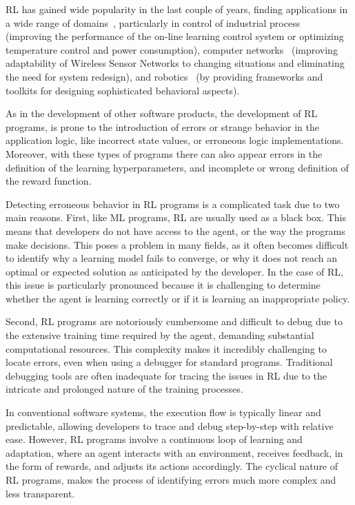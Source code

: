 \ac{RL} has gained wide popularity in the last couple of years, finding applications in a wide range of 
domains~\citet{beakcheol19}, particularly in control of industrial process~\cite{kiumarsi18} (improving 
the performance of the on-line learning control system or optimizing temperature control and power 
consumption), computer networks~\cite{alrawi13} (improving adaptability of Wireless Sensor Networks 
to changing situations and eliminating the need for system redesign), and robotics~\cite{zhang15} (by 
providing frameworks and toolkits for designing sophisticated behavioral aspects). 

As in the development of other software products, the development of \ac{RL} programs, is prone to 
the introduction of errors or strange behavior in the application logic, like incorrect state values, or 
erroneous logic implementations. Moreover, with these types of programs there can also appear 
errors in the definition of the learning hyperparameters, and incomplete or wrong definition of the 
reward function. 

Detecting erroneous behavior in \ac{RL} programs is a complicated task due to two main 
reasons. First, like \ac{ML} programs, \ac{RL} are usually used as a black box. 
This means that developers do not have access to the agent, or the way the programs make 
decisions. This poses a problem in many fields, as it often becomes difficult to identify why a learning 
model fails to converge, or why it does not reach an optimal or expected solution as 
anticipated by the developer. In the case of \ac{RL}, this issue is particularly 
pronounced because it is challenging to determine whether the agent is learning 
correctly or if it is learning an inappropriate policy.

Second, \ac{RL} programs are notoriously cumbersome and difficult to debug due to the extensive 
training time required by the agent, demanding substantial computational resources. This 
complexity makes it incredibly challenging to locate errors, even when using a 
debugger for standard programs. Traditional debugging tools are often inadequate 
for tracing the issues in \ac{RL} due to the intricate and prolonged nature of the 
training processes. 

In conventional software systems, the execution flow is typically linear and predictable, 
allowing developers to trace and debug step-by-step with relative ease. However, 
\ac{RL} programs involve a continuous loop of learning and adaptation, where an agent 
interacts with an environment, receives feedback, in the form of rewards, and adjusts its actions 
accordingly. The cyclical nature of \ac{RL} programs, makes the 
process of identifying errors much more complex and less transparent.

